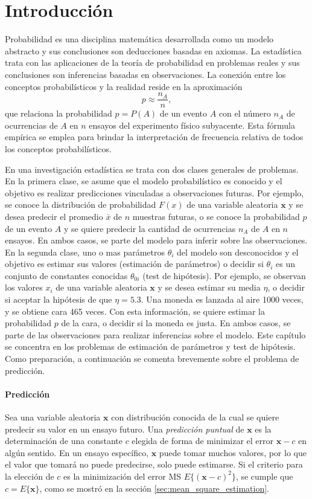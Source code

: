 \documentclass[a4paper]{report}
\newcommand{\x}{\mathbf{x}}
\begin{document}
\section{Introducción}

Probabilidad es una disciplina matemática desarrollada como un modelo abstracto y sus conclusiones son deducciones basadas en axiomas. La estadística trata con las aplicaciones de la teoría de probabilidad en problemas reales y sus conclusiones son inferencias basadas en observaciones. La conexión entre los conceptos probabilísticos y la realidad reside en la aproximación
\[
 p\approx\frac{n_A}{n},
\]
que relaciona la probabilidad \(p=P(A)\) de un evento \(A\) con el número \(n_A\) de ocurrencias de \(A\) en \(n\) ensayos del experimento físico subyacente. Esta fórmula empírica se emplea para brindar la interpretación de frecuencia relativa de todos los conceptos probabilísticos.

En una investigación estadística se trata con dos clases generales de problemas. En la primera clase, se asume que el modelo probabilístico es conocido y el objetivo es realizar predicciones vinculadas a observaciones futuras. Por ejemplo, se conoce la distribución de probabilidad \(F(x)\) de una variable aleatoria \(\x\) y se desea predecir el promedio \(\bar{x}\) de \(n\)  muestras futuras, o se conoce la probabilidad \(p\) de un evento \(A\) y se quiere predecir la cantidad de ocurrencias \(n_A\) de \(A\) en \(n\) ensayos. En ambos casos, se parte del modelo para inferir sobre las observaciones. En la segunda clase, uno o mas parámetros \(\theta_i\) del modelo son desconocidos y el objetivo es estimar sus valores (estimación de parámetros) o decidir si \(\theta_i\) es un conjunto de constantes conocidas \(\theta_{0i}\) (test de hipótesis). Por ejemplo, se observan los valores \(x_i\) de una variable aleatoria \(\x\) y se desea estimar su media \(\eta\), o decidir si aceptar la hipótesis de que \(\eta=5.3\). Una moneda es lanzada al aire 1000 veces, y se obtiene cara 465 veces. Con esta información, se quiere estimar la probabilidad \(p\) de la cara, o decidir si la moneda es justa. En ambos casos, se parte de las observaciones para realizar inferencias sobre el modelo. Este capítulo se concentra en los problemas de estimación de parámetros y test de hipótesis. Como preparación, a continuación se comenta brevemente sobre el problema de predicción.

\paragraph{Predicción} Sea una variable aleatoria \(\x\) con distribución conocida de la cual se quiere predecir su valor en un ensayo futuro. Una \emph{predicción puntual} de \(\x\) es la determinación de una constante \(c\) elegida de forma de minimizar el error \(\x-c\) en algún sentido. En un ensayo específico, \(\x\) puede tomar muchos valores, por lo que el valor que tomará no puede predecirse, solo puede estimarse. Si el criterio para la elección de \(c\) es la minimización del error MS \(E\{(\x-c)^2\}\), se cumple que \(c=E\{\x\}\), como se mostró en la sección \ref{sec:mean_square_estimation}. 
\end{document}
